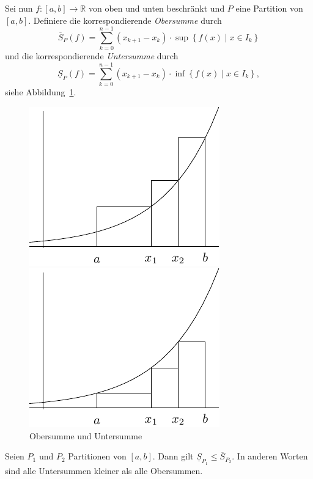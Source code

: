 \documentclass[../main.tex]{subfiles}
\begin{document}
Sei nun $f \colon [a, b] \to \mathbb{R}$ von oben und
unten beschränkt und $P$ eine Partition von $[a, b]$.
Definiere die korrespondierende \emph{Obersumme} durch
\[
  \overline S_P(f)
  = \sum_{k = 0}^{n - 1} (x_{k + 1} - x_k)
  \cdot \sup \left\{f(x) \mid x \in I_k \right\}
\]
und die korrespondierende \emph{Untersumme} durch
\[
  \underline S_P(f)
  = \sum_{k = 0}^{n - 1} (x_{k + 1} - x_k)
  \cdot \inf \left\{f(x) \mid x \in I_k \right\},
\]
siehe Abbildung~\ref{fig:riemann}.

\begin{figure}[htb] 
  \centering
  \begin{minipage}{0.50\textwidth}
    \centering

    \includegraphics{images/sum-upper}
  \end{minipage}%
  \begin{minipage}{0.50\textwidth}
    \centering

    \includegraphics{images/sum-lower}
  \end{minipage}%
  \caption{Obersumme und Untersumme}%
  \label{fig:riemann}
\end{figure}

\begin{lemma*}
  Seien $P_1$ und $P_2$ Partitionen
  von $[a, b]$. Dann gilt
  $\underline S_{P_1} \leq \overline S_{P_2}$.
  In anderen Worten sind alle Untersummen
  kleiner als alle Obersummen.
\end{lemma*}
\end{document}

